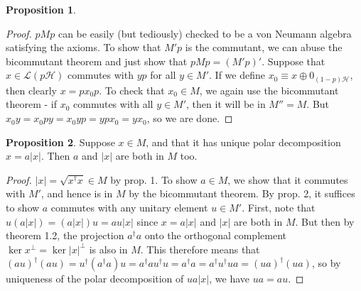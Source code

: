 \documentclass[12pt,a4paper]{article}
\numberwithin{equation}{section}
\theoremstyle{definition}
\theoremstyle{theorem}
\newtheorem{proposition}{Proposition}
\begin{document}
\begin{itemize}
\begin{proposition}
		\end{proposition}
		\begin{proof}
			$pMp$ can be easily (but tediously) checked to be a von Neumann algebra satisfying the axioms. To show that $M'p$ is the commutant, we can abuse the bicommutant theorem and just show that $pMp=(M'p)'$. Suppose that $x\in \mathcal{L}(p\mathcal{H})$ commutes with $yp$ for all $y\in M'$. If we define $x_{0}\equiv x\oplus 0_{(1-p)\mathcal{H}}$, then clearly $x=px_{0}p$. To check that $x_{0}\in M$, we again use the bicommutant theorem - if $x_{0}$ commutes with all $y\in M'$, then it will be in $M''=M$. But $x_{0}y=x_{0}py=x_{0}yp=ypx_{0}=yx_{0}$, so we are done. 
		\end{proof}
		\begin{proposition}
			Suppose $x\in M$, and that it has unique polar decomposition $x=a|x|$. Then $a$ and $|x|$ are both in $M$ too.
		\end{proposition}
		\begin{proof}
			$|x|=\sqrt{x^{\dagger}x}\in M$ by prop. 1. To show $a\in M$, we show that it commutes with $M'$, and hence is in $M$ by the bicommutant theorem. By prop. 2, it suffices to show $a$ commutes with any unitary element $u\in M'$. First, note that $u(a|x|)=(a|x|)u=au|x|$ since $x=a|x|$ and $|x|$ are both in $M$. But then by theorem 1.2, the projection $a^{\dagger}a$ onto the orthogonal complement $\ker{x}^{\perp}=\ker{|x|}^{\perp}$ is also in $M$. This therefore means that $(au)^{\dagger}(au)=u^{\dagger}(a^{\dagger}a)u=a^{\dagger}au^{\dagger}u=a^{\dagger}a=a^{\dagger}u^{\dagger}ua=(ua)^{\dagger}(ua)$, so by uniqueness of the polar decomposition of $ua|x|$, we have $ua=au$. 
		\end{proof}
	\end{itemize}
\end{document}
